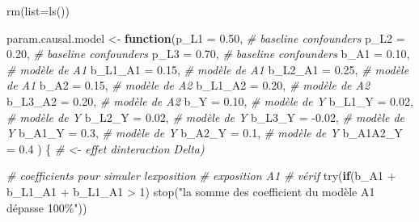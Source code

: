 \documentclass[
]{book}
\newenvironment{Shaded}{\begin{snugshade}}{\end{snugshade}}
\newcommand{\AttributeTok}[1]{\textcolor[rgb]{0.77,0.63,0.00}{#1}}
\newcommand{\CommentTok}[1]{\textcolor[rgb]{0.56,0.35,0.01}{\textit{#1}}}
\newcommand{\ControlFlowTok}[1]{\textcolor[rgb]{0.13,0.29,0.53}{\textbf{#1}}}
\newcommand{\DecValTok}[1]{\textcolor[rgb]{0.00,0.00,0.81}{#1}}
\newcommand{\FloatTok}[1]{\textcolor[rgb]{0.00,0.00,0.81}{#1}}
\newcommand{\FunctionTok}[1]{\textcolor[rgb]{0.00,0.00,0.00}{#1}}
\newcommand{\NormalTok}[1]{#1}
\newcommand{\OtherTok}[1]{\textcolor[rgb]{0.56,0.35,0.01}{#1}}
\newcommand{\SpecialCharTok}[1]{\textcolor[rgb]{0.00,0.00,0.00}{#1}}
\newcommand{\StringTok}[1]{\textcolor[rgb]{0.31,0.60,0.02}{#1}}
\begin{document}
\begin{Shaded}
\begin{Highlighting}[]
  \FunctionTok{rm}\NormalTok{(}\AttributeTok{list=}\FunctionTok{ls}\NormalTok{())}

\NormalTok{  param.causal.model }\OtherTok{\textless{}{-}} \ControlFlowTok{function}\NormalTok{(}\AttributeTok{p\_L1 =} \FloatTok{0.50}\NormalTok{, }\CommentTok{\# baseline confounders}
                                 \AttributeTok{p\_L2 =} \FloatTok{0.20}\NormalTok{, }\CommentTok{\# baseline confounders}
                                 \AttributeTok{p\_L3 =} \FloatTok{0.70}\NormalTok{, }\CommentTok{\# baseline confounders}
                                 \AttributeTok{b\_A1 =} \FloatTok{0.10}\NormalTok{,    }\CommentTok{\# modèle de A1}
                                 \AttributeTok{b\_L1\_A1 =} \FloatTok{0.15}\NormalTok{, }\CommentTok{\# modèle de A1}
                                 \AttributeTok{b\_L2\_A1 =} \FloatTok{0.25}\NormalTok{, }\CommentTok{\# modèle de A1}
                                 \AttributeTok{b\_A2 =} \FloatTok{0.15}\NormalTok{,    }\CommentTok{\# modèle de A2}
                                 \AttributeTok{b\_L1\_A2 =} \FloatTok{0.20}\NormalTok{, }\CommentTok{\# modèle de A2 }
                                 \AttributeTok{b\_L3\_A2 =} \FloatTok{0.20}\NormalTok{, }\CommentTok{\# modèle de A2}
                                 \AttributeTok{b\_Y =} \FloatTok{0.10}\NormalTok{,      }\CommentTok{\# modèle de Y}
                                 \AttributeTok{b\_L1\_Y =} \FloatTok{0.02}\NormalTok{,   }\CommentTok{\# modèle de Y}
                                 \AttributeTok{b\_L2\_Y =} \FloatTok{0.02}\NormalTok{,   }\CommentTok{\# modèle de Y}
                                 \AttributeTok{b\_L3\_Y =} \SpecialCharTok{{-}}\FloatTok{0.02}\NormalTok{,  }\CommentTok{\# modèle de Y}
                                 \AttributeTok{b\_A1\_Y =} \FloatTok{0.3}\NormalTok{,    }\CommentTok{\# modèle de Y}
                                 \AttributeTok{b\_A2\_Y =} \FloatTok{0.1}\NormalTok{,    }\CommentTok{\# modèle de Y}
                                 \AttributeTok{b\_A1A2\_Y =} \FloatTok{0.4}\NormalTok{ ) \{ }\CommentTok{\# \textless{}{-} effet d\textquotesingle{}interaction Delta)}

  \CommentTok{\# coefficients pour simuler l\textquotesingle{}exposition}
  \CommentTok{\# exposition A1  \# vérif}
  \FunctionTok{try}\NormalTok{(}\ControlFlowTok{if}\NormalTok{(b\_A1 }\SpecialCharTok{+}\NormalTok{ b\_L1\_A1 }\SpecialCharTok{+}\NormalTok{ b\_L1\_A1 }\SpecialCharTok{\textgreater{}} \DecValTok{1}\NormalTok{) }
    \FunctionTok{stop}\NormalTok{(}\StringTok{"la somme des coefficient du modèle A1 dépasse 100\%"}\NormalTok{))}
  

\end{Highlighting}
\end{Shaded}
\end{document}
